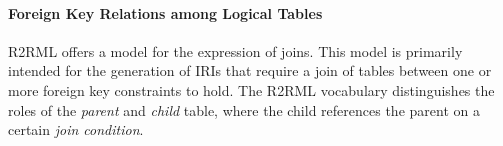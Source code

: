 



%
%


\paragraph{Foreign Key Relations among Logical Tables}

R2RML offers a model for the expression of joins.
This model is primarily intended for
the generation of IRIs
that require a join of tables between one or more foreign key constraints to hold.
The R2RML vocabulary distinguishes the roles of the \emph{parent} and \emph{child} table,
where the child references the parent on a certain \emph{join condition}.

